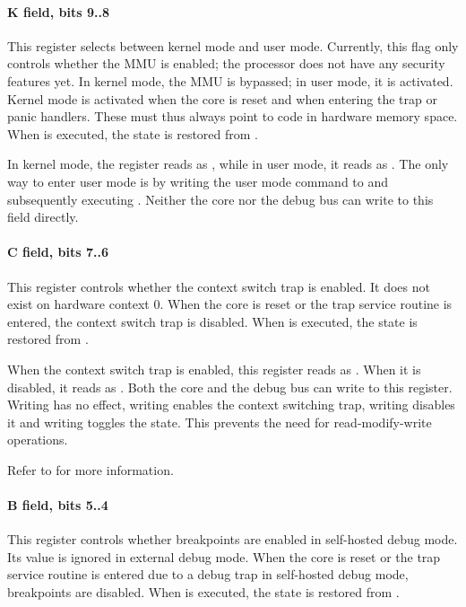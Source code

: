 \paragraph*{K field, bits 9..8}
This register selects between kernel mode and user mode. Currently, this flag
only controls whether the MMU is enabled; the \rvex{} processor does not have
any security features yet. In kernel mode, the MMU is bypassed; in user mode, it
is activated. Kernel mode is activated when the core is reset and when entering
the trap or panic handlers. These must thus always point to code in hardware
memory space. When  is executed, the state is restored from
.

In kernel mode, the register reads as , while in user mode, it reads as
. The only way to enter user mode is by writing the user mode command
to  and subsequently executing . Neither the core nor the
debug bus can write to this field directly.
\paragraph*{C field, bits 7..6}
This register controls whether the context switch trap is enabled. It does not
exist on hardware context 0. When the core is reset or the trap service routine
is entered, the context switch trap is disabled. When  is executed,
the state is restored from .

When the context switch trap is enabled, this register reads as . When
it is disabled, it reads as . Both the core and the debug bus can write
to this register. Writing  has no effect, writing  enables the
context switching trap, writing  disables it and writing 
toggles the state. This prevents the need for read-modify-write operations.

Refer to  for more information.
\paragraph*{B field, bits 5..4}
This register controls whether breakpoints are enabled in self-hosted debug
mode. Its value is ignored in external debug mode. When the core is reset or the
trap service routine is entered due to a debug trap in self-hosted debug mode,
breakpoints are disabled. When  is executed, the state is restored
from .


